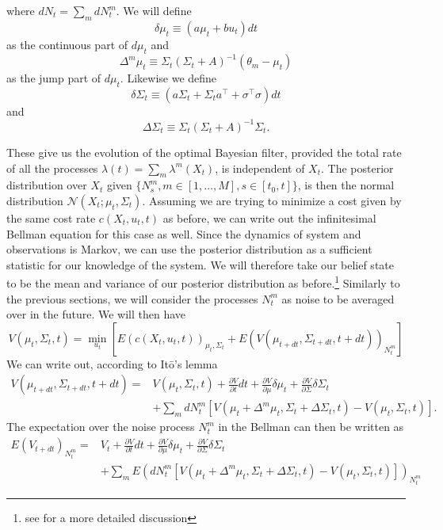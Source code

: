 where $dN_t = \sum_m dN^m_t$. We will define 
$$\delta \mu_t \equiv (a\mu_t + b u_t) dt$$ as the continuous part of $d\mu_t$ and 
$$\Delta^m \mu_t \equiv \Sigma_t \left(\Sigma_t + A\right)^{-1} \left(\theta_m - \mu_t\right) $$ as the jump part of $d\mu_t$. Likewise we define
$$\delta\Sigma_t \equiv (a\Sigma_t + \Sigma_t a^\top + \sigma^\top \sigma)dt$$ and $$\Delta\Sigma_t \equiv \Sigma_t \left(\Sigma_t + A\right)^{-1} \Sigma_t.$$\par
These give us the evolution of the optimal Bayesian filter, provided the total rate of all the processes $\lambda (t) = \sum_m \lambda^m(X_t)$, is independent of $X_t$. The posterior distribution over $X_t$ given $\{N^m_s, m\in [1,\ldots,M], s\in[t_0,t]\}$, is then the normal distribution $\mathcal{N}(X_t;\mu_t,\Sigma_t)$. Assuming we are trying to minimize a cost given by the same cost rate $c(X_t,u_t,t)$ as before, we can write out the infinitesimal Bellman equation for this case as well. Since the dynamics of system and observations is Markov, we can use the posterior distribution as a sufficient statistic for our knowledge of the system. We will therefore take our belief state to be the mean and variance of our posterior distribution as before.\footnote{see \citep{bertsekas2012} for a more detailed discussion}
Similarly to the previous sections, we will consider the processes $N^m_t$ as noise to be averaged over in the future. We will then have
$$
V(\mu_t,\Sigma_t,t)= \min_{u_t} \left[E\left(c(X_t,u_t,t)\right)_{\mu_t,\Sigma_t} + E\left(V(\mu_{t+dt},\Sigma_{t+dt},t+dt)\right)_{N^m_t}\right]
$$
We can write out, according to It\=o's lemma
\begin{eqnarray*}
V(\mu_{t+dt},\Sigma_{t+dt},t+dt) =& V(\mu_t,\Sigma_t,t) + \frac{\partial V}{\partial t}dt + \frac{\partial V}{\partial \mu} \delta\mu_t +\frac{\partial V}{\partial \Sigma} \delta \Sigma_t\\ &+ \sum_m dN^m_t\left[V\left(\mu_t +\Delta^m\mu_t , \Sigma_t+\Delta\Sigma_t,t\right)-V(\mu_t,\Sigma_t,t)\right].
\end{eqnarray*}
The expectation over the noise process $N^m_t$ in the Bellman can then be written as
\begin{eqnarray*}
E(V_{t+dt})_{N^m_t} =&V_t + \frac{\partial V}{\partial t}dt + \frac{\partial V}{\partial \mu} \delta\mu_t +\frac{\partial V}{\partial \Sigma} \delta \Sigma_t\\ &+ \sum_m E\left(dN^m_t\left[V\left(\mu_t +\Delta^m\mu_t , \Sigma_t+\Delta\Sigma_t,t\right)-V(\mu_t,\Sigma_t,t)\right]\right)_{N^m_t} 
\end{eqnarray*}
